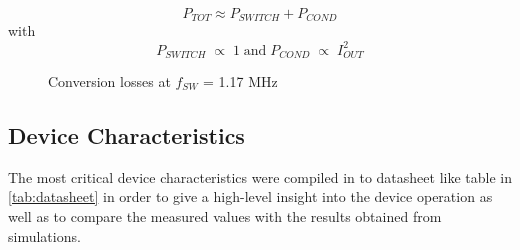 \begin{equation}
    P_{TOT} \approx P_{SWITCH} + P_{COND}
\end{equation}
\label{eq:PLoss}
with
\begin{equation*}
   P_{SWITCH}\;\propto\;1\; \textrm{and} \;P_{COND}\;\propto\;I_{OUT}^2
\end{equation*}

\begin{figure}[h]
    \centering
    
    \caption{Conversion losses at $f_{SW}$ = 1.17 MHz}
    \label{fig:losses}
\end{figure}
\clearpage

\subsection{Device Characteristics}
\label{sec:characteristics}
The most critical device characteristics were compiled in to datasheet like table in \autoref{tab:datasheet} in order to give a high-level insight into the device operation as well as to compare the measured values with the results obtained from simulations.



